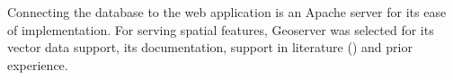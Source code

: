 
Connecting the database to the web application is an Apache server for its ease of implementation. For serving spatial features, Geoserver was selected for its vector data support, its documentation, support in literature (\cite{Bhattacharya2018,Jiang2020,Sami2019}) and prior experience. 




